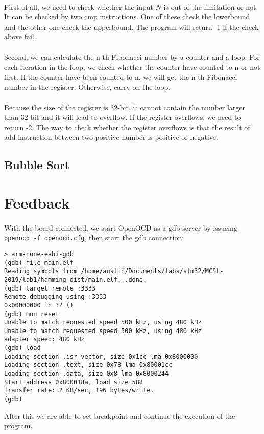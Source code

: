 \paragraph{}
First of all, we need to check whether the input $N$ is out of the limitation or not. It can be checked by two cmp instructions. One of these check the lowerbound and the other one check the upperbound. The program will return -1 if the check above fail.
\paragraph{}
Second, we can calculate the n-th Fibonacci number by a counter and a loop. For each iteration in the loop, we check whether the counter have counted to n or not first. If the counter have been counted to n, we will get the n-th Fibonacci number in the register. Otherwise, carry on the loop.
\paragraph{}
Because the size of the register is 32-bit, it cannot contain the number larger than 32-bit and it will lead to overflow. If the register overflows, we need to return -2. The way to check whether the register overflows is that the result of add instruction between two positive number is positive or negative.
\subsection{Bubble Sort}
\paragraph{}
\section{Feedback}
\paragraph{}
With the board connected, we start OpenOCD as a gdb server by issueing \texttt{openocd -f openocd.cfg}, then start the gdb connection:
\begin{lstlisting}
> arm-none-eabi-gdb
(gdb) file main.elf
Reading symbols from /home/austin/Documents/labs/stm32/MCSL-2019/lab1/hamming_dist/main.elf...done.
(gdb) target remote :3333
Remote debugging using :3333
0x00000000 in ?? ()
(gdb) mon reset
Unable to match requested speed 500 kHz, using 480 kHz
Unable to match requested speed 500 kHz, using 480 kHz
adapter speed: 480 kHz
(gdb) load
Loading section .isr_vector, size 0x1cc lma 0x8000000
Loading section .text, size 0x78 lma 0x80001cc
Loading section .data, size 0x8 lma 0x8000244
Start address 0x800018a, load size 588
Transfer rate: 2 KB/sec, 196 bytes/write.
(gdb)
\end{lstlisting}
After this we are able to set breakpoint and continue the execution of the program.
